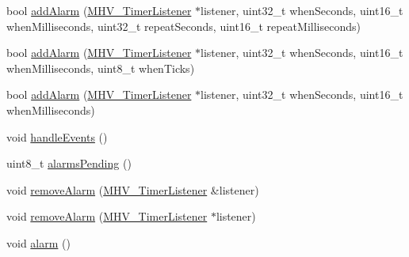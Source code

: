 \begin{DoxyCompactItemize}
\item 
bool \hyperlink{class_m_h_v___r_t_c_a3c2af7eb56925a7c9506e2bb1f0ed965}{add\-Alarm} (\hyperlink{class_m_h_v___timer_listener}{\-M\-H\-V\-\_\-\-Timer\-Listener} $\ast$listener, uint32\-\_\-t when\-Seconds, uint16\-\_\-t when\-Milliseconds, uint32\-\_\-t repeat\-Seconds, uint16\-\_\-t repeat\-Milliseconds)
\item 
bool \hyperlink{class_m_h_v___r_t_c_a75077124ea1071f263cd06e1b35b1c5c}{add\-Alarm} (\hyperlink{class_m_h_v___timer_listener}{\-M\-H\-V\-\_\-\-Timer\-Listener} $\ast$listener, uint32\-\_\-t when\-Seconds, uint16\-\_\-t when\-Milliseconds, uint8\-\_\-t when\-Ticks)
\item 
bool \hyperlink{class_m_h_v___r_t_c_a64fab0fcc6e61e087c5424ef2e456d4a}{add\-Alarm} (\hyperlink{class_m_h_v___timer_listener}{\-M\-H\-V\-\_\-\-Timer\-Listener} $\ast$listener, uint32\-\_\-t when\-Seconds, uint16\-\_\-t when\-Milliseconds)
\item 
void \hyperlink{class_m_h_v___r_t_c_abebdf394ea6ed2c48f80cc02d4371a90}{handle\-Events} ()
\item 
uint8\-\_\-t \hyperlink{class_m_h_v___r_t_c_a78c9916568b91c43ba000a8fa851e3e5}{alarms\-Pending} ()
\item 
void \hyperlink{class_m_h_v___r_t_c_a255a2beeb975fe84bd667a4ee0f42e5d}{remove\-Alarm} (\hyperlink{class_m_h_v___timer_listener}{\-M\-H\-V\-\_\-\-Timer\-Listener} \&listener)
\item 
void \hyperlink{class_m_h_v___r_t_c_a16370e9cac54100c69776b0786f65cf1}{remove\-Alarm} (\hyperlink{class_m_h_v___timer_listener}{\-M\-H\-V\-\_\-\-Timer\-Listener} $\ast$listener)
\item 
void \hyperlink{class_m_h_v___r_t_c_a949570f89977560cc68dc909e7d0a805}{alarm} ()
\end{DoxyCompactItemize}
